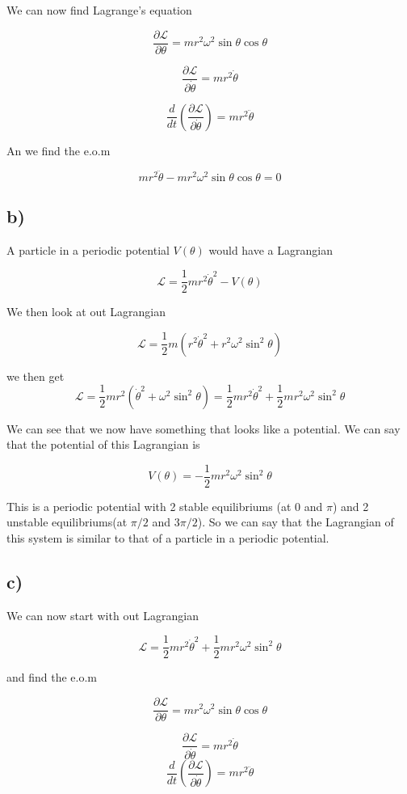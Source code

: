 \documentclass[a4paper,norsk, 10pt]{article}
\begin{document}
We can now find Lagrange's equation

$$
\frac{\partial \mathcal{L}}{\partial \theta} = mr^2\omega^2 \sin\theta \cos\theta
$$

$$
\frac{\partial \mathcal{L}}{\partial \dot{\theta}} = mr^2\dot{\theta}
$$

$$
\frac{d}{dt}\left( \frac{\partial \mathcal{L}}{\partial \dot{\theta}} \right) = mr^2\ddot{\theta}
$$

An we find the e.o.m

$$
mr^2\ddot{\theta} - mr^2\omega^2 \sin\theta \cos\theta = 0
$$

\subsection*{b)}
A particle in a periodic potential $V(\theta)$ would have a Lagrangian

$$
\mathcal{L} = \frac{1}{2}mr^2\dot{\theta}^2 - V(\theta)
$$

We then look at out Lagrangian

$$
\mathcal{L} = \frac{1}{2}m(r^2\dot{\theta}^2 + r^2\omega^2\sin^2\theta)
$$

we then get
$$
\mathcal{L} = \frac{1}{2}mr^2(\dot{\theta}^2 + \omega^2\sin^2\theta) = \frac{1}{2}mr^2\dot{\theta}^2 + \frac{1}{2}mr^2 \omega^2\sin^2\theta
$$

We can see that we now have something that looks like a potential. We can say that the potential of this Lagrangian is

$$
V(\theta) = -\frac{1}{2}mr^2\omega^2\sin^2\theta
$$

This is a periodic potential with 2 stable equilibriums (at $0$ and $\pi$) and 2 unstable equilibriums(at $\pi/2$ and $3\pi/2$). So we can say that the Lagrangian of this system is similar to that of a particle in a periodic potential.

\subsection*{c)}

We can now start with out Lagrangian

$$
\mathcal{L} = \frac{1}{2}mr^2\dot{\theta}^2 + \frac{1}{2}mr^2 \omega^2\sin^2\theta
$$

and find the e.o.m

$$
\frac{\partial \mathcal{L}}{\partial \theta} = mr^2\omega^2\sin\theta\cos\theta
$$

$$
\frac{\partial \mathcal{L}}{\partial \dot{\theta}} = mr^2\dot{\theta}
$$
$$
\frac{d}{dt}\left(\frac{\partial \mathcal{L}}{\partial \dot{\theta}}\right) = mr^2\ddot{\theta}
$$
\end{document}
